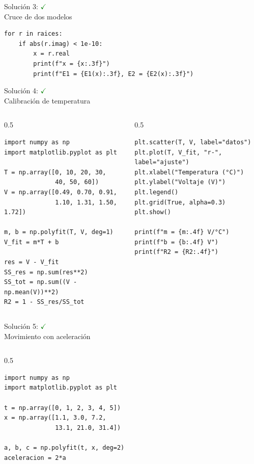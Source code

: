 \documentclass[10pt]{beamer}
\begin{document}
\begin{solutionblock}
\begin{frame}[fragile]{Solución 3: \hfill \textcolor{green}{$\checkmark$} \\ Cruce de dos modelos}
\begin{verbatim}
for r in raices:
    if abs(r.imag) < 1e-10:
        x = r.real
        print(f"x = {x:.3f}")
        print(f"E1 = {E1(x):.3f}, E2 = {E2(x):.3f}")
\end{verbatim}
\end{frame}

\begin{frame}[fragile]{Solución 4: \hfill \textcolor{green}{$\checkmark$} \\ Calibración de temperatura}
\begin{columns}
\begin{column}{0.5\textwidth}
\begin{verbatim}
import numpy as np
import matplotlib.pyplot as plt

T = np.array([0, 10, 20, 30,
              40, 50, 60])
V = np.array([0.49, 0.70, 0.91,
              1.10, 1.31, 1.50, 1.72])

m, b = np.polyfit(T, V, deg=1)
V_fit = m*T + b

res = V - V_fit
SS_res = np.sum(res**2)
SS_tot = np.sum((V - np.mean(V))**2)
R2 = 1 - SS_res/SS_tot
\end{verbatim}
\end{column}
\begin{column}{0.5\textwidth}
\begin{verbatim}
plt.scatter(T, V, label="datos")
plt.plot(T, V_fit, "r-", label="ajuste")
plt.xlabel("Temperatura (°C)")
plt.ylabel("Voltaje (V)")
plt.legend()
plt.grid(True, alpha=0.3)
plt.show()

print(f"m = {m:.4f} V/°C")
print(f"b = {b:.4f} V")
print(f"R2 = {R2:.4f}")
\end{verbatim}
\end{column}
\end{columns}
\end{frame}

\begin{frame}[fragile]{Solución 5: \hfill \textcolor{green}{$\checkmark$} \\ Movimiento con aceleración}
\begin{columns}
\begin{column}{0.5\textwidth}
\begin{verbatim}
import numpy as np
import matplotlib.pyplot as plt

t = np.array([0, 1, 2, 3, 4, 5])
x = np.array([1.1, 3.0, 7.2,
              13.1, 21.0, 31.4])

a, b, c = np.polyfit(t, x, deg=2)
aceleracion = 2*a


\end{verbatim}
\end{column}
\end{columns}
\end{frame}
\end{solutionblock}
\end{document}
